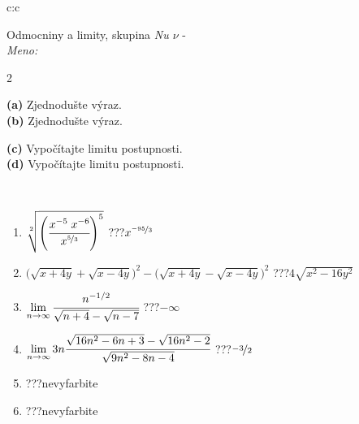 \documentclass[10pt]{report}
\begin{document}
\begin{tabular}{c:c}
\begin{minipage}[c][104.5mm][t]{0.5\linewidth}
\begin{center}
\vspace{7mm}
{\huge Odmocniny a limity, skupina \textit{Nu $\nu$} -}\\[5mm]
\textit{Meno:}\phantom{xxxxxxxxxxxxxxxxxxxxxxxxxxxxxxxxxxxxxxxxxxxxxxxxxxxxxxxxxxxxxxxxx}\\[5mm]
\begin{minipage}{0.95\linewidth}
\begin{center}
{\small \begin{multicols}{2} \raggedright
\textbf{(a)} Zjednodušte výraz. \\[1mm]
\textbf{(b)} Zjednodušte výraz. \par \columnbreak
\textbf{(c)} Vypočítajte limitu postupnosti. \\[1mm]
\textbf{(d)} Vypočítajte limitu postupnosti.
\end{multicols}
}
\end{center}
\end{minipage}
\\[4mm]
\begin{minipage}{0.79\linewidth}
\begin{center}
\begin{varwidth}{\linewidth}
\begin{enumerate}
\small
\item $\sqrt[2]{\left(\cfrac{x^{-5}\;x^{-6}}{x^{\nicefrac{5}{3}}}\right)^{5}}$\quad \dotfill\; ???\;\dotfill \quad $x^{\nicefrac{-95}{3}}$
\item {\footnotesize{\scriptsize$\big(\sqrt{x+4y}+\sqrt{x-4y}\big)^2-\big(\sqrt{x+4y}-\sqrt{x-4y}\big)^2$}\quad \dotfill\; ???\;\dotfill \quad $4\sqrt{x^2-16y^2}$}
\item $\lim\limits_{n\to\infty}\cfrac{n^{-1/2}}{\sqrt{n+4}-\sqrt{n-7}}$\quad \dotfill\; ???\;\dotfill \quad $-\infty$
\item $\lim\limits_{n\to\infty}3n\cfrac{\sqrt{16n^2-6n+3}-\sqrt{16n^2-2}}{\sqrt{9n^2-8n-4}}$\quad \dotfill\; ???\;\dotfill \quad $\nicefrac{-3}{2}$
\item \quad \dotfill\; ???\;\dotfill \quad nevyfarbite
\item \quad \dotfill\; ???\;\dotfill \quad nevyfarbite
\end{enumerate}
\end{varwidth}
\end{center}
\end{minipage}

\end{center}
\end{minipage}
\end{tabular}
\end{document}
